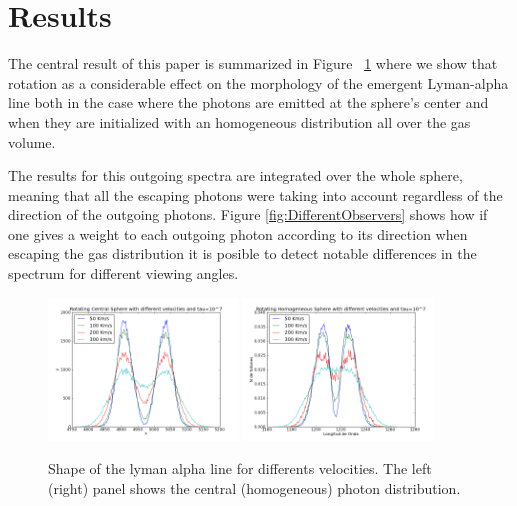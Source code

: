 \documentclass[usenatbib]{mn2e}
\begin{document}
\section{Results}
\label{sec:results}

The central result of this paper is summarized in Figure
~\ref{fig:HOMandCentral} where we show that rotation as a considerable
effect on the morphology of the emergent Lyman-alpha line both in the
case where the photons are emitted at the sphere's center and when
they are initialized with an homogeneous distribution all over the
gas volume. 

The results for this outgoing spectra are integrated over the whole
sphere, meaning that all the escaping photons were taking into account
regardless of the direction of the outgoing photons. Figure
\ref{fig:DifferentObservers} shows how if one gives a weight to each outgoing
photon according to its direction when escaping the gas distribution
it is posible to detect notable differences in the spectrum for
different viewing angles.



\begin{figure}
  \includegraphics[width=0.45\textwidth]{7tDifSpeedsZ.png}
  \includegraphics[width=0.45\textwidth]{7tHOMDifSpeeds1.png}
  \label{fig:HOMandCentral}\caption{Shape of the lyman alpha line for
    differents velocities. The left (right) panel shows the central
    (homogeneous) photon distribution.}
\end{figure}
\end{document}
